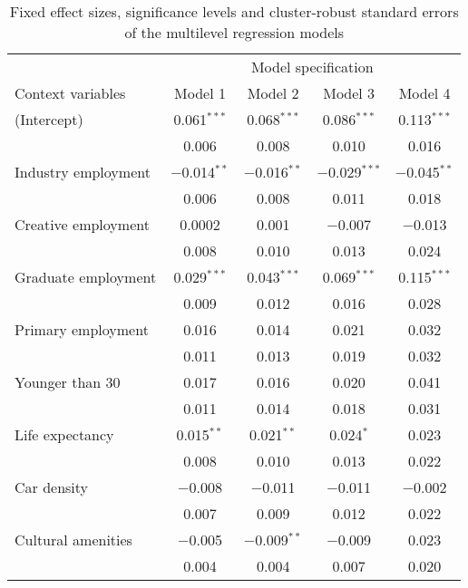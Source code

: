 \begin{table}

\caption[Fixed effects of the multilevel regression models]{Fixed effect sizes, significance levels and cluster-robust standard errors of the multilevel regression models}
\label{tab:multilevel}
\centering
\begin{tabular}[t]{lcccc}
\toprule
\multicolumn{1}{c}{ } & \multicolumn{4}{c}{Model specification} \\
\cmidrule(l{3pt}r{3pt}){2-5}
Context variables & Model 1 & Model 2 & Model 3 & Model 4\\
\midrule
(Intercept) & \num{0.061}$^{***}$ & \num{0.068}$^{***}$ & \num{0.086}$^{***}$ & \num{0.113}$^{***}$\\
 & \num{0.006} & \num{0.008} & \num{0.010} & \num{0.016}\\
Industry employment & \num{-0.014}$^{**}$ & \num{-0.016}$^{**}$ & \num{-0.029}$^{***}$ & \num{-0.045}$^{**}$\\
 & \num{0.006} & \num{0.008} & \num{0.011} & \num{0.018}\\
Creative employment & \num{0.0002} & \num{0.001} & \num{-0.007} & \num{-0.013}\\
 & \num{0.008} & \num{0.010} & \num{0.013} & \num{0.024}\\
Graduate employment & \num{0.029}$^{***}$ & \num{0.043}$^{***}$ & \num{0.069}$^{***}$ & \num{0.115}$^{***}$\\
 & \num{0.009} & \num{0.012} & \num{0.016} & \num{0.028}\\
Primary employment & \num{0.016} & \num{0.014} & \num{0.021} & \num{0.032}\\
 & \num{0.011} & \num{0.013} & \num{0.019} & \num{0.032}\\
Younger than 30 & \num{0.017} & \num{0.016} & \num{0.020} & \num{0.041}\\
 & \num{0.011} & \num{0.014} & \num{0.018} & \num{0.031}\\
Life expectancy & \num{0.015}$^{**}$ & \num{0.021}$^{**}$ & \num{0.024}$^{*}$ & \num{0.023}\\
 & \num{0.008} & \num{0.010} & \num{0.013} & \num{0.022}\\
Car density & \num{-0.008} & \num{-0.011} & \num{-0.011} & \num{-0.002}\\
 & \num{0.007} & \num{0.009} & \num{0.012} & \num{0.022}\\
Cultural amenities & \num{-0.005} & \num{-0.009}$^{**}$ & \num{-0.009} & \num{0.023}\\
 & \num{0.004} & \num{0.004} & \num{0.007} & \num{0.020}\\

\end{tabular}
\end{table}
